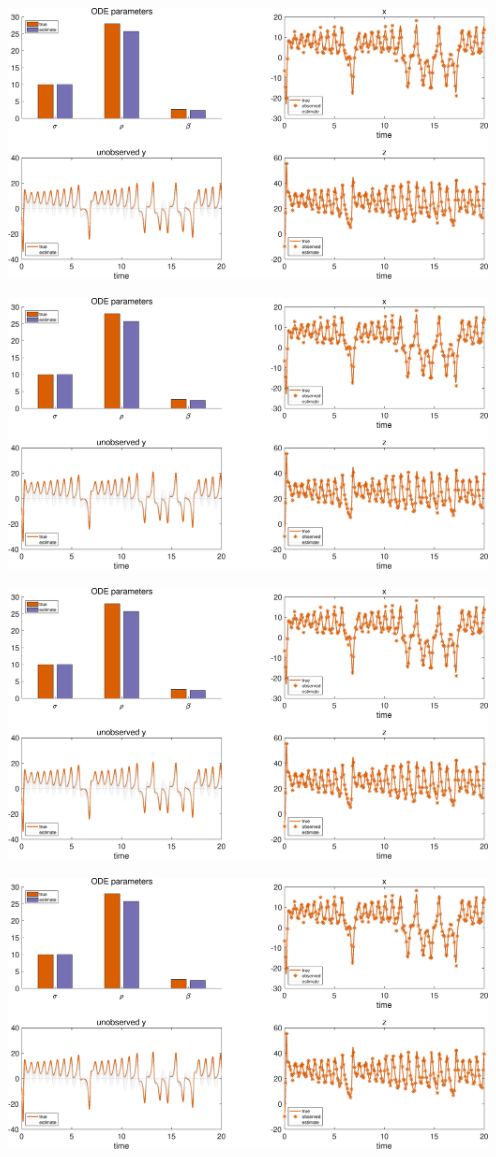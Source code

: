 {\includegraphics [width=5in]{Lorenz_attractor_4_24.eps}

\includegraphics [width=5in]{Lorenz_attractor_4_25.eps}

\includegraphics [width=5in]{Lorenz_attractor_4_26.eps}

\includegraphics [width=5in]{Lorenz_attractor_4_27.eps}

}
